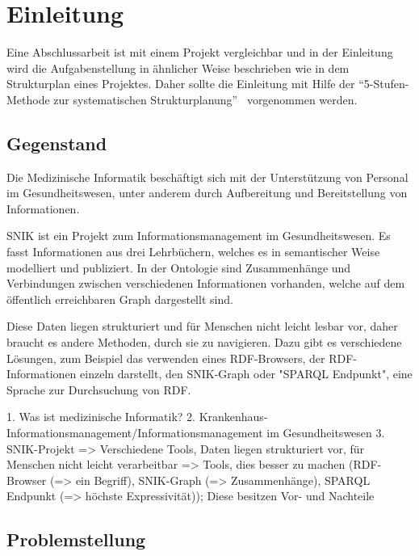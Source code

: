 \chapter{Einleitung}\label{ch:introduction}
Eine Abschlussarbeit ist mit einem Projekt vergleichbar und in der Einleitung wird die Aufgabenstellung in ähnlicher Weise beschrieben wie in dem Strukturplan eines Projektes.
Daher sollte die Einleitung mit Hilfe der \enquote{5-Stufen-Methode zur systematischen Strukturplanung}~\citep{ob}\footnotemark{} vorgenommen werden.

\section{Gegenstand}

Die Medizinische Informatik beschäftigt sich mit der Unterstützung von Personal im Gesundheitswesen, unter anderem durch Aufbereitung und Bereitstellung von Informationen.

SNIK ist ein Projekt zum Informationsmanagement im Gesundheitswesen.
Es fasst Informationen aus drei Lehrbüchern, welches es in semantischer Weise modelliert und publiziert.
In der Ontologie sind Zusammenhänge und Verbindungen zwischen verschiedenen Informationen vorhanden, welche auf dem öffentlich erreichbaren Graph dargestellt sind.

Diese Daten liegen strukturiert und für Menschen nicht leicht lesbar vor, daher braucht es andere Methoden, durch sie zu navigieren.
Dazu gibt es verschiedene Lösungen, zum Beispiel das verwenden eines RDF-Browsers, der RDF-Informationen einzeln darstellt, den SNIK-Graph oder "SPARQL Endpunkt", eine Sprache zur Durchsuchung von RDF.

1. Was ist medizinische Informatik?
2. Krankenhaus-Informationsmanagement/Informationsmanagement im Gesundheitswesen
3. SNIK-Projekt
=> Verschiedene Tools, Daten liegen strukturiert vor, für Menschen nicht leicht verarbeitbar => Tools, dies besser zu machen (RDF-Browser (=> ein Begriff), SNIK-Graph (=> Zusammenhänge), SPARQL Endpunkt (=> höchste Expressivität)); Diese besitzen Vor- und Nachteile


\section{Problemstellung}

